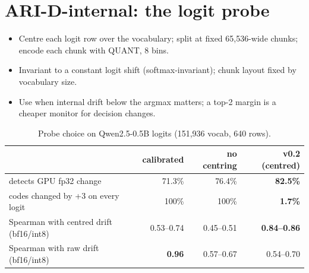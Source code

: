\documentclass{article}
\begin{document}
\section{ARI-D-internal: the logit probe}\label{app:logit}
\begin{itemize}
  \item Centre each logit row over the vocabulary; split at fixed 65{,}536-wide chunks; encode each chunk with QUANT, 8 bins.
  \item Invariant to a constant logit shift (softmax-invariant); chunk layout fixed by vocabulary size.
  \item Use when internal drift below the argmax matters; a top-2 margin is a cheaper monitor for decision changes.
\end{itemize}
\begin{table}[h]\centering\footnotesize
\caption{Probe choice on Qwen2.5-0.5B logits (151{,}936 vocab, 640 rows).}
\begin{tabular}{lrrr}
\toprule
 & calibrated & no centring & v0.2 (centred) \\
\midrule
detects GPU fp32 change & 71.3\% & 76.4\% & \textbf{82.5\%} \\
codes changed by +3 on every logit & 100\% & 100\% & \textbf{1.7\%} \\
Spearman with centred drift (bf16/int8) & 0.53--0.74 & 0.45--0.51 & \textbf{0.84--0.86} \\
Spearman with raw drift (bf16/int8) & \textbf{0.96} & 0.57--0.67 & 0.54--0.70 \\
\bottomrule
\end{tabular}
\end{table}
\end{document}

